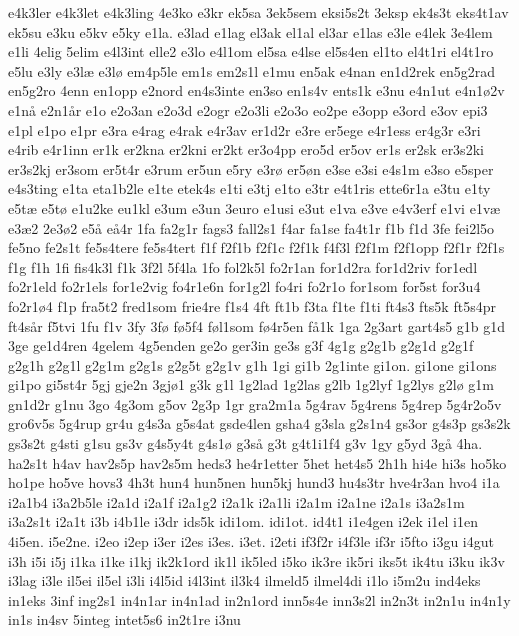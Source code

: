 {e4k3ler
e4k3let
e4k3ling
4e3ko
e3kr
ek5sa
3ek5sem
eksi5s2t
3eksp
ek4s3t
eks4t1av
ek5su
e3ku
e5kv
e5ky
e1la.
e3lad
e1lag
el3ak
el1al
el3ar
e1las
e3le
e4lek
3e4lem
e1li
4elig
5elim
e4l3int
elle2
e3lo
e4l1om
el5sa
e4lse
el5s4en
el1to
el4t1ri
el4t1ro
e5lu
e3ly
e3l^^e6
e3l^^f8
em4p5le
em1s
em2s1l
e1mu
en5ak
e4nan
en1d2rek
en5g2rad
en5g2ro
4enn
en1opp
e2nord
en4s3inte
en3so
en1s4v
ents1k
e3nu
e4n1ut
e4n1^^f82v
e1n^^e5
e2n1^^e5r
e1o
e2o3an
e2o3d
e2ogr
e2o3li
e2o3o
eo2pe
e3opp
e3ord
e3ov
epi3
e1pl
e1po
e1pr
e3ra
e4rag
e4rak
e4r3av
er1d2r
e3re
er5ege
e4r1ess
er4g3r
e3ri
e4rib
e4r1inn
er1k
er2kna
er2kni
er2kt
er3o4pp
ero5d
er5ov
er1s
er2sk
er3s2ki
er3s2kj
er3som
er5t4r
e3rum
er5un
e5ry
e3r^^f8
er5^^f8n
e3se
e3si
e4s1m
e3so
e5sper
e4s3ting
e1ta
eta1b2le
e1te
etek4s
e1ti
e3tj
e1to
e3tr
e4t1ris
ette6r1a
e3tu
e1ty
e5t^^e6
e5t^^f8
e1u2ke
eu1kl
e3um
e3un
3euro
e1usi
e3ut
e1va
e3ve
e4v3erf
e1vi
e1v^^e6
e3^^e62
2e3^^f82
e5^^e5
e^^e54r
1fa
fa2g1r
fags3
fall2s1
f4ar
fa1se
fa4t1r
f1b
f1d
3fe
fei2l5o
fe5no
fe2s1t
fe5s4tere
fe5s4tert
f1f
f2f1b
f2f1c
f2f1k
f4f3l
f2f1m
f2f1opp
f2f1r
f2f1s
f1g
f1h
1fi
fis4k3l
f1k
3f2l
5f4la
1fo
fol2k5l
fo2r1an
for1d2ra
for1d2riv
for1edl
fo2r1eld
fo2r1els
for1e2vig
fo4r1e6n
for1g2l
fo4ri
fo2r1o
for1som
for5st
for3u4
fo2r1^^f84
f1p
fra5t2
fred1som
frie4re
f1s4
4ft
ft1b
f3ta
f1te
f1ti
ft4s3
fts5k
ft5s4pr
ft4s^^e5r
f5tvi
1fu
f1v
3fy
3f^^f8
f^^f85f4
f^^f8l1som
f^^f84r5en
f^^e51k
1ga
2g3art
gart4s5
g1b
g1d
3ge
ge1d4ren
4gelem
4g5enden
ge2o
ger3in
ge3s
g3f
4g1g
g2g1b
g2g1d
g2g1f
g2g1h
g2g1l
g2g1m
g2g1s
g2g5t
g2g1v
g1h
1gi
gi1b
2g1inte
gi1on.
gi1one
gi1ons
gi1po
gi5st4r
5gj
gje2n
3gj^^f81
g3k
g1l
1g2lad
1g2las
g2lb
1g2lyf
1g2lys
g2l^^f8
g1m
gn1d2r
g1nu
3go
4g3om
g5ov
2g3p
1gr
gra2m1a
5g4rav
5g4rens
5g4rep
5g4r2o5v
gro6v5s
5g4rup
gr4u
g4s3a
g5s4at
gsde4len
gsha4
g3sla
g2s1n4
gs3or
g4s3p
gs3s2k
gs3s2t
g4sti
g1su
gs3v
g4s5y4t
g4s1^^f8
g3s^^e5
g3t
g4t1i1f4
g3v
1gy
g5yd
3g^^e5
4ha.
ha2s1t
h4av
hav2s5p
hav2s5m
heds3
he4r1etter
5het
het4s5
2h1h
hi4e
hi3s
ho5ko
ho1pe
ho5ve
hovs3
4h3t
hun4
hun5nen
hun5kj
hund3
hu4s3tr
hve4r3an
hvo4
i1a
i2a1b4
i3a2b5le
i2a1d
i2a1f
i2a1g2
i2a1k
i2a1li
i2a1m
i2a1ne
i2a1s
i3a2s1m
i3a2s1t
i2a1t
i3b
i4b1le
i3dr
ids5k
idi1om.
idi1ot.
id4t1
i1e4gen
i2ek
i1el
i1en
4i5en.
i5e2ne.
i2eo
i2ep
i3er
i2es
i3es.
i3et.
i2eti
if3f2r
i4f3le
if3r
i5fto
i3gu
i4gut
i3h
i5i
i5j
i1ka
i1ke
i1kj
ik2k1ord
ik1l
ik5led
i5ko
ik3re
ik5ri
iks5t
ik4tu
i3ku
ik3v
i3lag
i3le
il5ei
il5el
i3li
i4l5id
i4l3int
il3k4
ilmeld5
ilmel4di
i1lo
i5m2u
ind4eks
in1eks
3inf
ing2s1
in4n1ar
in4n1ad
in2n1ord
inn5s4e
inn3s2l
in2n3t
in2n1u
in4n1y
in1s
in4sv
5integ
intet5s6
in2t1re
i3nu
}
